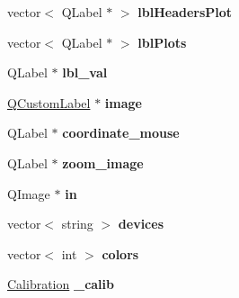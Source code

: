 \begin{DoxyCompactItemize}
\item 
\hypertarget{classMainWindow_a1b39db4ffb71d848273a68ec5e9a9212}{vector$<$ Q\-Label $\ast$ $>$ {\bfseries lbl\-Headers\-Plot}}\label{classMainWindow_a1b39db4ffb71d848273a68ec5e9a9212}

\item 
\hypertarget{classMainWindow_a69cc5316b71bc5aae325d3dac4db76aa}{vector$<$ Q\-Label $\ast$ $>$ {\bfseries lbl\-Plots}}\label{classMainWindow_a69cc5316b71bc5aae325d3dac4db76aa}

\item 
\hypertarget{classMainWindow_aabefa899f757a2f4557b6aeb8fe491da}{Q\-Label $\ast$ {\bfseries lbl\-\_\-val}}\label{classMainWindow_aabefa899f757a2f4557b6aeb8fe491da}

\item 
\hypertarget{classMainWindow_a2b4e7dadf9705d00ac5266a41e9bda4e}{\hyperlink{classQCustomLabel}{Q\-Custom\-Label} $\ast$ {\bfseries image}}\label{classMainWindow_a2b4e7dadf9705d00ac5266a41e9bda4e}

\item 
\hypertarget{classMainWindow_af55218a3717b137c673d1a44dfbefa49}{Q\-Label $\ast$ {\bfseries coordinate\-\_\-mouse}}\label{classMainWindow_af55218a3717b137c673d1a44dfbefa49}

\item 
\hypertarget{classMainWindow_a40bac1ed8e340d876c78a76139b0dd61}{Q\-Label $\ast$ {\bfseries zoom\-\_\-image}}\label{classMainWindow_a40bac1ed8e340d876c78a76139b0dd61}

\item 
\hypertarget{classMainWindow_a747d09716ab770596ab6c7da4db422f5}{Q\-Image $\ast$ {\bfseries in}}\label{classMainWindow_a747d09716ab770596ab6c7da4db422f5}

\item 
\hypertarget{classMainWindow_a2b35cc9cc85f624c20c5f77f70f6cac5}{vector$<$ string $>$ {\bfseries devices}}\label{classMainWindow_a2b35cc9cc85f624c20c5f77f70f6cac5}

\item 
\hypertarget{classMainWindow_a50e022a7b906a07cd22deb48b3151740}{vector$<$ int $>$ {\bfseries colors}}\label{classMainWindow_a50e022a7b906a07cd22deb48b3151740}

\item 
\hypertarget{classMainWindow_a759d318080fa015f809ba8ad68313788}{\hyperlink{structcommon_1_1Calibration}{Calibration} {\bfseries \-\_\-calib}}\label{classMainWindow_a759d318080fa015f809ba8ad68313788}


\end{DoxyCompactItemize}
